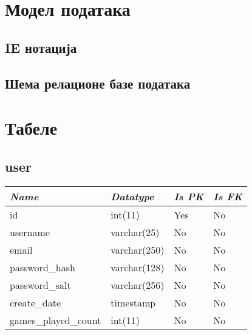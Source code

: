 \section{Модел података}

\subsection{IE нотација}

\subsection{Шема релационе базе података}





\section{Табеле}

\subsection{user}

\begin{table}[h!]
\centering
\small

    \begin{tabular}{ | m{} | m{} | m{} | m{} | }
    \hline
        \cellcolor{blue!25}\textbf{\textit{Name}} &

        \cellcolor{blue!25}\textbf{\textit{Datatype}} &
        \cellcolor{blue!25}\textbf{\textit{Is PK}} &
        \cellcolor{blue!25}\textbf{\textit{Is FK}} \\
    \hline
    \hline
        id & int(11) & Yes & No \\
    \hline
        username & varchar(25) & No & No \\
    \hline
        email & varchar(250) & No & No \\
    \hline
        password\_hash & varchar(128) & No & No \\
    \hline
        password\_salt & varchar(256) & No & No \\
    \hline
        create\_date & timestamp & No & No \\
    \hline
        games\_played\_count & int(11) & No & No \\
    \hline
    \end{tabular}

\end{table}



